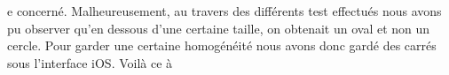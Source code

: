 \documentclass{article}
\begin{document}
{e} concern\'{e}. Malheureusement, au travers des diff\'{e}rents test effectu\'{e}s nous avons pu observer qu'en dessous d'une certaine taille, on obtenait un oval et non un cercle. Pour garder une certaine homog\'{e}n\'{e}it\'{e} nous avons donc gard\'{e} des carr\'{e}s sous l'interface iOS. 
Voil\`{a} ce \`{a} 
\end{document}
